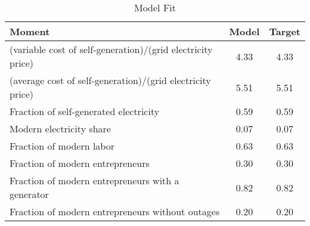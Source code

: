 \begin{table}[H] 
\center 
\singlespace 
\caption{Model Fit} \label{model_fit}
\vspace{-.1in} 
\begin{tabular}{l c c }\hline 
\hline 
 {Moment} & Model  & Target \\ [.5ex] 
\hline 
(variable cost of self-generation)/(grid electricity price)  &     4.33 &     4.33    \\ (average cost of self-generation)/(grid electricity price)  &     5.51 &     5.51    \\ Fraction of self-generated electricity  &     0.59 &     0.59    \\  Modern electricity share &     0.07 &     0.07    \\  Fraction of modern labor  &     0.63 &     0.63    \\  Fraction of modern entrepreneurs  &     0.30 &     0.30    \\  Fraction of modern entrepreneurs with a generator &     0.82 &     0.82    \\  Fraction of modern entrepreneurs without outages &     0.20 &     0.20    \\  \hline 
\end{tabular}
\end{table} 
